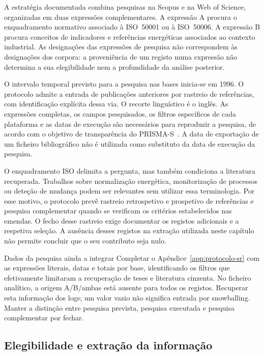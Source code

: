 A estratégia documentada combina pesquisas na Scopus e na Web of Science,
organizadas em duas expressões complementares. A expressão A procura o
enquadramento normativo associado à ISO~50001 ou à ISO~50006. A expressão B
procura conceitos de indicadores e referências energéticas associados
ao contexto industrial. As designações das expressões de pesquisa não
correspondem às designações dos corpora: a proveniência de um registo
numa expressão não determina a sua elegibilidade nem a profundidade
da análise posterior.

O intervalo temporal previsto para a pesquisa nas bases inicia-se em
1996. O protocolo admite a entrada de publicações anteriores por rastreio
de referências, com identificação explícita dessa via. O recorte
linguístico é o inglês. As expressões completas, os campos pesquisados,
os filtros específicos de cada plataforma e as datas de execução são
necessários para reproduzir a pesquisa, de acordo com o objetivo de
transparência do PRISMA-S~\cite{Rethlefsen2021PRISMAS}. A data de exportação
de um ficheiro bibliográfico não é utilizada como substituto da data
de execução da pesquisa.

O enquadramento ISO delimita a pergunta, mas também condiciona a
literatura recuperada. Trabalhos sobre normalização energética,
monitorização de processos ou deteção de mudança podem ser relevantes
sem utilizar essa terminologia. Por esse motivo, o protocolo prevê
rastreio retrospetivo e prospetivo de referências e pesquisa complementar
quando se verificam os critérios estabelecidos nas emendas. O fecho desse
rastreio exige documentar os registos adicionais e a respetiva seleção.
A ausência desses registos na extração utilizada neste capítulo não
permite concluir que o seu contributo seja nulo.

{Dados da pesquisa ainda a integrar}
{Completar o Apêndice~\ref{app:protocolo-sr} com as expressões literais,
datas e totais por base, identificando os filtros que efetivamente
limitaram a recuperação de teses e literatura cinzenta. No ficheiro
analítico, a origem A/B/ambas está ausente para todos os registos.
Recuperar esta informação dos logs; um valor vazio não significa
entrada por snowballing. Manter a distinção entre pesquisa prevista,
pesquisa executada e pesquisa complementar por fechar.}%

\subsection{Elegibilidade e extração da informação}

